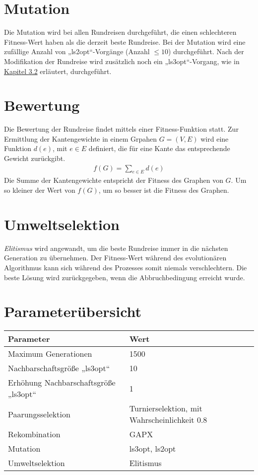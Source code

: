 \section{Mutation}
Die Mutation wird bei allen Rundreisen durchgeführt, die einen
schlechteren Fitness-Wert haben als die derzeit beste Rundreise. 
Bei der Mutation wird eine zufällige Anzahl von „ls2opt“-Vorgänge
(Anzahl $\leq 10$) durchgeführt. Nach der Modifikation der Rundreise wird
zusätzlich noch ein „ls3opt“-Vorgang, wie in \hyperref[ls3opt_func]{Kapitel
3.2} erläutert, durchgeführt.

\section{Bewertung}
Die Bewertung der Rundreise findet mittels einer Fitness-Funktion statt.
Zur Ermittlung der Kantengewichte in einem Grpahen $G = (V, E)$ wird
eine Funktion $d(e)$, mit $e \in E$ definiert, die für eine Kante das
entsprechende Gewicht zurückgibt.
\begin{align*}
   f(G) = \sum_{e \in E} d(e)
\end{align*}
Die Summe der Kantengewichte entspricht der Fitness des Graphen von
$G$. Um so kleiner der Wert von $f(G)$, um so besser ist die Fitness des
Graphen.

\section{Umweltselektion}
\textit{Elitismus} wird angewandt,
um die beste Rundreise immer in die nächsten Generation zu übernehmen.
Der Fitness-Wert während des evolutionären Algorithmus kann sich während
des Prozesses somit niemals verschlechtern. Die beste Lösung wird
zurückgegeben, wenn die Abbruchbedingung erreicht wurde.
\section{Parameterübersicht}
\begin{tabular}{l|p{5.4cm}}
  \textbf{Parameter} & \textbf{Wert} \\
  \hline
  Maximum Generationen & 1500 \\
  \hline
  Nachbarschaftsgröße „ls3opt“ & 10 \\
  \hline
  Erhöhung Nachbarschaftsgröße „ls3opt“ & 1 \\
  \hline
  Paarungsselektion & Turnierselektion, \newline mit Wahrscheinlichkeit 0.8 \\
  \hline
  Rekombination & GAPX\\
  \hline
  Mutation & ls3opt, ls2opt\\
  \hline
  Umweltselektion & Elitismus \\
  \hline
\end{tabular}
